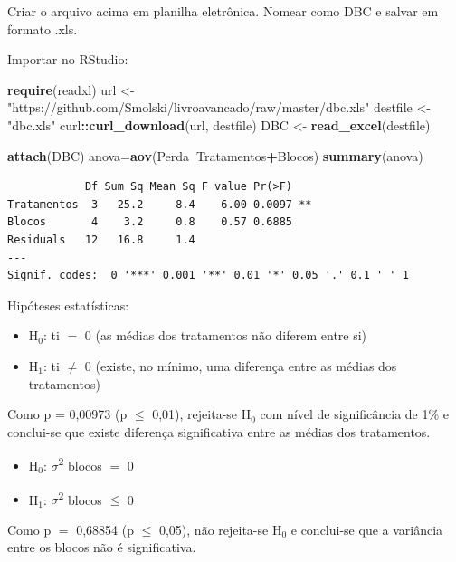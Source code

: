 \documentclass[12pt,brazil,oneside]{book}
\newenvironment{Shaded}{\begin{snugshade}}{\end{snugshade}}
\newcommand{\KeywordTok}[1]{\textcolor[rgb]{0.13,0.29,0.53}{\textbf{#1}}}
\newcommand{\NormalTok}[1]{#1}
\newcommand{\OperatorTok}[1]{\textcolor[rgb]{0.81,0.36,0.00}{\textbf{#1}}}
\newcommand{\StringTok}[1]{\textcolor[rgb]{0.31,0.60,0.02}{#1}}
\providecommand{\tightlist}{%
  \setlength{\itemsep}{0pt}\setlength{\parskip}{0pt}}
\begin{document}
Criar o arquivo acima em planilha eletrônica. Nomear como DBC e salvar em formato .xls.

Importar no RStudio:

\begin{Shaded}
\begin{Highlighting}[]
\KeywordTok{require}\NormalTok{(readxl)}
\NormalTok{url <-}\StringTok{ "https://github.com/Smolski/livroavancado/raw/master/dbc.xls"}
\NormalTok{destfile <-}\StringTok{ "dbc.xls"}
\NormalTok{curl}\OperatorTok{::}\KeywordTok{curl_download}\NormalTok{(url, destfile)}
\NormalTok{DBC  <-}\StringTok{ }\KeywordTok{read_excel}\NormalTok{(destfile)}

\KeywordTok{attach}\NormalTok{(DBC)}
\NormalTok{anova=}\KeywordTok{aov}\NormalTok{(Perda}\OperatorTok{~}\NormalTok{Tratamentos}\OperatorTok{+}\NormalTok{Blocos)}
\KeywordTok{summary}\NormalTok{(anova)}
\end{Highlighting}
\end{Shaded}

\begin{verbatim}
            Df Sum Sq Mean Sq F value Pr(>F)   
Tratamentos  3   25.2     8.4    6.00 0.0097 **
Blocos       4    3.2     0.8    0.57 0.6885   
Residuals   12   16.8     1.4                  
---
Signif. codes:  0 '***' 0.001 '**' 0.01 '*' 0.05 '.' 0.1 ' ' 1
\end{verbatim}

Hipóteses estatísticas:

\begin{itemize}
\tightlist
\item
  H\(_0\): ti \(=\) 0 (as médias dos tratamentos não diferem entre si)
\item
  H\(_1\): ti \(\neq\) 0 (existe, no mínimo, uma diferença entre as médias dos tratamentos)
\end{itemize}

Como p = 0,00973 (p \(\leq\) 0,01), rejeita-se H\(_0\) com nível de significância de 1\% e conclui-se que existe diferença significativa entre as médias dos tratamentos.

\begin{itemize}
\tightlist
\item
  H\(_0\): \(\sigma\)\textsuperscript{2} blocos \(=\) 0
\item
  H\(_1\): \(\sigma\)\textsuperscript{2} blocos \(\leq\) 0
\end{itemize}

Como p \(=\) 0,68854 (p \(\leq\) 0,05), não rejeita-se H\(_0\) e conclui-se que a variância entre os blocos não é significativa.
\end{document}
